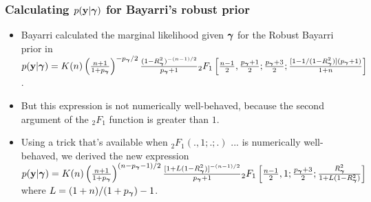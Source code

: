\documentclass{beamer}
\begin{document}
\begin{frame}
	\frametitle{Calculating $p({\bf y} | {\boldsymbol \gamma})$ for Bayarri's robust prior}
	\begin{itemize}
		\item Bayarri calculated the marginal likelihood given ${\boldsymbol \gamma}$ for the Robust Bayarri prior
		 	in \cite{Bayarri2012} 
			\tiny
			$p({\bf y} | {\boldsymbol \gamma}) = K(n) \left(\frac{n + 1}{1 + p_{\boldsymbol \gamma}}\right)^{-p_{\boldsymbol \gamma}/2} \frac{(1 - R^2_{\boldsymbol \gamma})^{-(n-1)/2}}{p_{\boldsymbol \gamma} + 1} {}_2 F_1 \left[ \frac{n-1}{2}, \frac{p_{\boldsymbol \gamma}+1}{2}; \frac{p_{\boldsymbol \gamma} + 3}{2}; \frac{[1 - 1/(1 - R^2_{\boldsymbol \gamma})](p_{\boldsymbol \gamma} + 1)}{1 + n} \right]$.
		\small
		\item But this expression is not numerically well-behaved, because the second argument of the
					${}_2 F_1$ function is greater than $1$.
		\item Using a trick that's available when ${}_2 F_1(., 1; .; .)$ ... is numerically
					well-behaved, we derived the new expression
			\tiny
			$p({\bf y} | {\boldsymbol \gamma}) = K(n) \left(\frac{n + 1}{1 + p_{\boldsymbol \gamma}}\right)^{(n-p_{\boldsymbol \gamma}-1)/2} \frac{[1 + L (1 - R^2_{\boldsymbol \gamma})]^{-(n-1)/2}}{p_{\boldsymbol \gamma} + 1} {}_2 F_1 \left[ \frac{n-1}{2}, 1; \frac{p_{\boldsymbol \gamma} + 3}{2}; 
			\frac{R^2_{\boldsymbol \gamma}}{1 + L(1 - R^2_{\boldsymbol \gamma})} \right]$ \\
			\small
			where $L = (1 + n)/(1 + p_{\boldsymbol \gamma}) - 1$.
	\end{itemize}
\end{frame}

\end{document}
